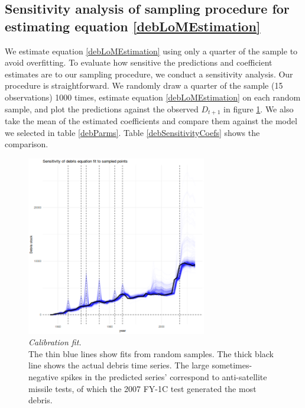 \documentclass[12pt]{article}
\begin{document}
\subsection{Sensitivity analysis of sampling procedure for estimating equation \ref{debLoMEstimation}}
\label{sensitivity}

We estimate equation \ref{debLoMEstimation} using only a quarter of the sample to avoid overfitting. To evaluate how sensitive the predictions and coefficient estimates are to our sampling procedure, we conduct a sensitivity analysis. Our procedure is straightforward. We randomly draw a quarter of the sample (15 observations) 1000 times, estimate equation \ref{debLoMEstimation} on each random sample, and plot the predictions against the observed $D_{t+1}$ in figure \ref{debSensitivityFig}. We also take the mean of the estimated coefficients and compare them against the model we selected in table \ref{debParms}. Table \ref{debSensitivityCoefs} shows the comparison.

\begin{figure}[H]
	\centering
	\includegraphics[width=0.7\textwidth]{../../images/debris_lom_sensitivity_plot.png}
	\captionsetup{format=hang}
	\caption{\textit{Calibration fit.} \\
		The thin blue lines show fits from random samples. The thick black line shows the actual debris time series. The large sometimes-negative spikes in the predicted series' correspond to anti-satellite missile tests, of which the 2007 FY-1C test generated the most debris.
	}
	\label{debSensitivityFig}
\end{figure}
\end{document}
